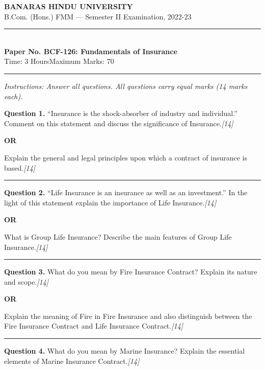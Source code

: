 \documentclass[11pt,a4paper]{article}
\newcommand{\pts}[1]{\hfill   \textit{[#1]}}
\begin{document}
\begin{center}
  {\large\bfseries BANARAS HINDU UNIVERSITY}\\[2pt]
  {\normalsize B.Com. (Hons.) FMM --- Semester II Examination, 2022-23}\\[6pt]
  \rule{0.8\linewidth}{0.5pt}\\[6pt]
  {\large\bfseries Paper No. BCF-126: Fundamentals of Insurance}\\[4pt]
  {\normalsize Time: 3 Hours\hfill Maximum Marks: 70}
\end{center}

\rule{\linewidth}{0.4pt}

\smallskip



\noindent   \textit{Instructions: Answer all questions. All questions carry equal marks (14 marks each).}

\bigskip




\noindent   \textbf{Question 1.}
``Insurance is the shock-absorber of industry and individual.'' Comment on this statement and discuss the significance of Insurance.\pts{14}

\centerline{   \textbf{OR}}

Explain the general and legal principles upon which a contract of insurance is based.\pts{14}

\medskip\rule{\linewidth}{0.2pt}




\noindent   \textbf{Question 2.}
``Life Insurance is an insurance as well as an investment.'' In the light of this statement explain the importance of Life Insurance.\pts{14}

\centerline{   \textbf{OR}}

What is Group Life Insurance? Describe the main features of Group Life Insurance.\pts{14}

\medskip\rule{\linewidth}{0.2pt}




\noindent   \textbf{Question 3.}
What do you mean by Fire Insurance Contract? Explain its nature and scope.\pts{14}

\centerline{   \textbf{OR}}

Explain the meaning of Fire in Fire Insurance and also distinguish between the Fire Insurance Contract and Life Insurance Contract.\pts{14}

\medskip\rule{\linewidth}{0.2pt}




\noindent   \textbf{Question 4.}
What do you mean by Marine Insurance? Explain the essential elements of Marine Insurance Contract.\pts{14}
\end{document}

